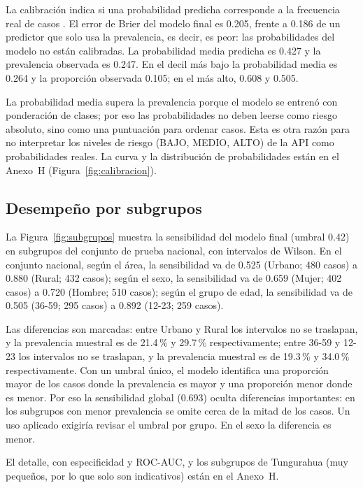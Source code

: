 La calibración indica si una probabilidad predicha corresponde a la frecuencia real de casos \cite{steyerberg2019clinical}. El error de Brier del modelo final es 0.205, frente a 0.186 de un predictor que solo usa la prevalencia, es decir, es peor: las probabilidades del modelo no están calibradas. La probabilidad media predicha es 0.427 y la prevalencia observada es 0.247. En el decil más bajo la probabilidad media es 0.264 y la proporción observada 0.105; en el más alto, 0.608 y 0.505.

La probabilidad media supera la prevalencia porque el modelo se entrenó con ponderación de clases; por eso las probabilidades no deben leerse como riesgo absoluto, sino como una puntuación para ordenar casos. Esta es otra razón para no interpretar los niveles de riesgo (BAJO, MEDIO, ALTO) de la API como probabilidades reales. La curva y la distribución de probabilidades están en el Anexo~H (Figura~\ref{fig:calibracion}).



\subsection{Desempeño por subgrupos}

La Figura~\ref{fig:subgrupos} muestra la sensibilidad del modelo final (umbral 0.42) en subgrupos del conjunto de prueba nacional, con intervalos de Wilson. En el conjunto nacional, según el área, la sensibilidad va de 0.525 (Urbano; 480 casos) a 0.880 (Rural; 432 casos); según el sexo, la sensibilidad va de 0.659 (Mujer; 402 casos) a 0.720 (Hombre; 510 casos); según el grupo de edad, la sensibilidad va de 0.505 (36-59; 295 casos) a 0.892 (12-23; 259 casos).

Las diferencias son marcadas: entre Urbano y Rural los intervalos no se traslapan, y la prevalencia muestral es de 21.4\,\% y 29.7\,\% respectivamente; entre 36-59 y 12-23 los intervalos no se traslapan, y la prevalencia muestral es de 19.3\,\% y 34.0\,\% respectivamente. Con un umbral único, el modelo identifica una proporción mayor de los casos donde la prevalencia es mayor y una proporción menor donde es menor. Por eso la sensibilidad global (0.693) oculta diferencias importantes: en los subgrupos con menor prevalencia se omite cerca de la mitad de los casos. Un uso aplicado exigiría revisar el umbral por grupo. En el sexo la diferencia es menor.

El detalle, con especificidad y ROC-AUC, y los subgrupos de Tungurahua (muy pequeños, por lo que solo son indicativos) están en el Anexo~H.

